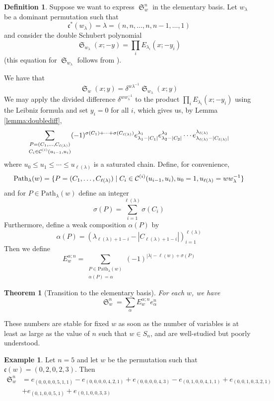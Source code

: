 \documentclass{amsart}
\newtheorem{theorem}{Theorem}[section]
\theoremstyle{definition}
\newtheorem{definition}[lemma]{Definition}
\newtheorem{example}[lemma]{Example}
\theoremstyle{remark}
\numberwithin{equation}{subsection}
\DeclareMathOperator{\sch}{\mathfrak{S}}
\newcommand{\code}{\mathfrak{c}}
\begin{document}
\begin{definition}
Suppose we want to express $\sch_w^n$ in the elementary basis. Let $w_{\lambda}$ be a dominant permutation such that 
$$\code^*(w_\lambda)=\lambda = (n, n, \ldots, n, n - 1,\ldots, 1)$$ 
and consider the double Schubert polynomial
$$\sch_{w_{\lambda}}(x;-y)=\prod_i E_{\lambda_i}(x;-y_i)$$
(this equation for $\sch_{w_\lambda}$ follows from \cite[(6.14)]{notes}).


We have that
$$\sch_w(x;y) = \delta^{w\lambda^{-1}}\sch_{w_{\lambda}}(x;y)$$
We may apply the divided difference $\delta^{ww_\lambda^{-1}}$ to the product $\prod_i E_{\lambda_i}(x;-y_i)$ using the Leibniz formula and set $y_i=0$ for all $i$, which gives us, by Lemma \ref{lemma:doublediff},
$$\sum_{\substack{P=(C_1,\ldots,C_{\ell(\lambda)})\\ C_i\in\mathcal{C}^{(i)}(u_{i-1},u_i)}}(-1)^{\sigma(C_1)+\cdots+\sigma(C_{\ell(\lambda)})}e_{\lambda_{1}-|C_1|}^{\lambda_1}e_{\lambda_2-|C_2|}^{\lambda_2}\cdots e_{\lambda_{\ell(\lambda)}-|C_{\ell(\lambda)}|}^{\lambda_{\ell(\lambda)}}$$
where $u_0 \leq u_1\leq \cdots \leq u_{\ell(\lambda)}$ is a saturated chain.
Define, for convenience,
$$\mathrm{Path}_\lambda(w) = \{P=(C_1,\ldots,C_{\ell(\lambda)})\mid C_i\in\mathcal{C}^{(i)}(u_{i-1},u_i),u_0=1,u_{\ell(\lambda)}=ww_\lambda^{-1}\}$$
and for $P\in\mathrm{Path}_\lambda(w)$ define an integer
$$\sigma(P) = \sum_{i=1}^{\ell(\lambda)} \sigma(C_i)$$
Furthermore, define a weak composition $\alpha(P)$ by
$$\alpha(P) = (\lambda_{\ell(\lambda) + 1 - i}-|C_{\ell(\lambda) + 1 - i}|)_{i=1}^{\ell(\lambda)}$$
Then we define
$$E^{\alpha;n}_w = \sum_{\substack{P \in \mathrm{Path}_\lambda(w)\\ \alpha(P)=\alpha}}(-1)^{|\lambda|-\ell(w)+\sigma(P)}$$
\end{definition}

\begin{theorem}[Transition to the elementary basis] \label{theorem:elemtrans}
	For each $w$, we have
	$$\sch_w^n = \sum_{\alpha}E_w^{\alpha;n}e_{\alpha}^n$$
\end{theorem}
These numbers are stable for fixed $w$ as soon as the number of variables is at least as large as the value of $n$ such that $w\in S_n$, and are well-studied but poorly understood.

\begin{example}
	Let $n=5$ and let $w$ be the permutation such that $\code(w)=(0,2,0,2,3)$. Then
	\begin{align*}
		\sch_w^n &= e_{(0,0,0,0,5,1,1)} - e_{(0,0,0,0,4,2,1)} + e_{(0,0,0,0,4,3)}- e_{(0,1,0,0,4,1,1)} +e_{(0,0,1,0,3,2,1)}\\
		&+e_{(0,1,0,0,5,1)} + e_{(0,1,0,0,3,3)}
	\end{align*}
\end{example}
\end{document}
